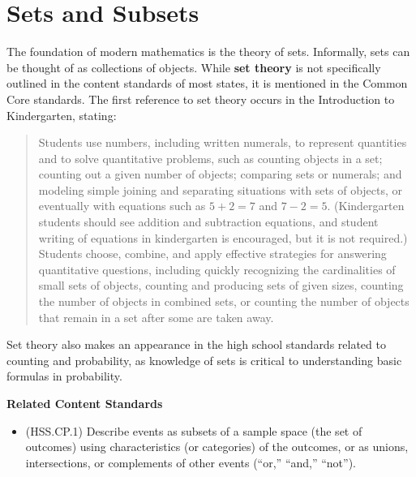 \documentclass[
]{book}
\providecommand{\tightlist}{%
  \setlength{\itemsep}{0pt}\setlength{\parskip}{0pt}}
\newenvironment{standards}{}{}
\theoremstyle{definition}
\theoremstyle{definition}
\theoremstyle{definition}
\theoremstyle{definition}
\theoremstyle{remark}
\begin{document}
\hypertarget{sets-and-subsets}{%
\section{Sets and Subsets}\label{sets-and-subsets}}

The foundation of modern mathematics is the theory of sets. Informally, sets can be thought of as collections of objects. While \textbf{set theory} is not specifically outlined in the content standards of most states, it is mentioned in the Common Core standards. The first reference to set theory occurs in the Introduction to Kindergarten, stating:

\begin{quote}
Students use numbers, including written numerals, to represent quantities and to solve quantitative problems, such as counting objects in a set; counting out a given number of objects; comparing sets or numerals; and modeling simple joining and separating situations with sets of objects, or eventually with equations such as \(5 + 2 = 7\) and \(7 - 2 = 5\). (Kindergarten students should see addition and subtraction equations, and student writing of equations in kindergarten is encouraged, but it is not required.) Students choose, combine, and apply effective strategies for answering quantitative questions, including quickly recognizing the cardinalities of small sets of objects, counting and producing sets of given sizes, counting the number of objects in combined sets, or counting the number of objects that remain in a set after some are taken away. \citep{CCSS}
\end{quote}

Set theory also makes an appearance in the high school standards related to counting and probability, as knowledge of sets is critical to understanding basic formulas in probability.

\begin{standards}

\begin{center}
\textbf{Related Content Standards}

\end{center}

\begin{itemize}
\tightlist
\item
  (HSS.CP.1) Describe events as subsets of a sample space (the set of outcomes) using characteristics (or categories) of the outcomes, or as unions, intersections, or complements of other events (``or,'' ``and,'' ``not'').
\end{itemize}

\end{standards}
\end{document}
